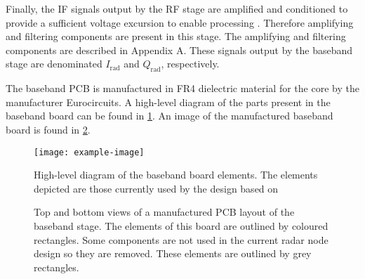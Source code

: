 Finally, the IF signals output by the RF stage are amplified and conditioned to provide a sufficient voltage excursion to enable processing \cite{Sardinero2022}. Therefore amplifying and filtering components are present in this stage. The amplifying and filtering components are described in Appendix A. %
These signals output by the baseband stage are denominated $I_\mathrm{rad}$ and $Q_\mathrm{rad}$, respectively.

The baseband PCB is manufactured in FR4 dielectric material for the core by the manufacturer Eurocircuits. A high-level diagram of the parts present in the baseband board can be found in \cref{fig:baseband_board_general_diagram}. An image of the manufactured baseband board is found in \cref{fig:baseband_board_general}.

\begin{figure}[htb]
	\centering
	\texttt{[image: example-image]}
	\caption{High-level diagram of the baseband board elements. The elements depicted are those currently used by the design based on \cite{Sardinero2022} \label{fig:baseband_board_general_diagram}}
\end{figure}

\begin{figure}[htb]
	\centering
	\caption{Top and bottom views of a manufactured PCB layout of the baseband stage. The elements of this board are outlined by coloured rectangles. Some components are not used in the current radar node design so they are removed. These elements are outlined by grey rectangles. \label{fig:baseband_board_general}}
\end{figure}

